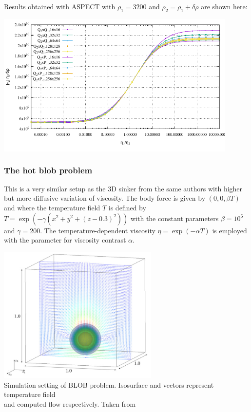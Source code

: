 Results obtained with ASPECT with $\rho_1=3200$ and $\rho_2=\rho_1+\delta\rho$ are shown here:

\begin{center}
\includegraphics[width=12cm]{images/benchmark_sinkingblock/aspect/v.pdf}
\end{center}


\subsubsection{The hot blob problem}\label{sec:hotblob}

This is a very similar setup as the 3D sinker from the same authors
with higher but more diffusive variation of viscosity.
The body force is given by $(0, 0, \beta T)$ and
where the temperature field $T$ is defined by $T = \exp  (-\gamma (x^2+y^2+(z-0.3)^2))$ 
with the constant parameters $\beta=10^6$ and $\gamma=200$. 
The temperature-dependent viscosity $\eta = \exp( -\alpha T)$ is employed with the parameter for viscosity
contrast $\alpha$.

\begin{center}
\includegraphics[width=8cm]{images/benchmark_hotblob/fumt11}\\
{\captionfont Simulation setting of BLOB problem. Isosurface and vectors represent temperature field \\and computed flow respectively. Taken from \cite{fumt11}}
\end{center}

